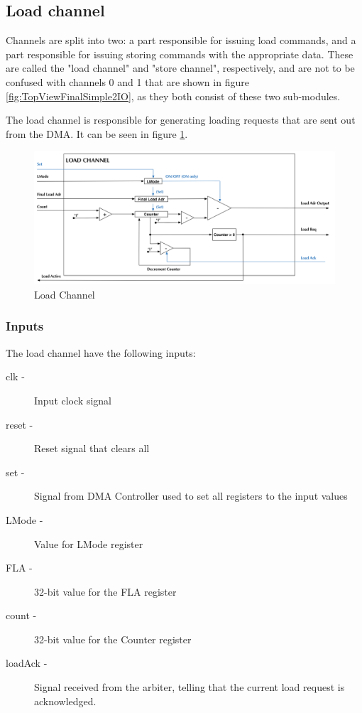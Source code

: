 \begin{appendix}
\subsection{Load channel}
Channels are split into two: 
a part responsible for issuing load commands, and a part responsible for issuing storing commands with the appropriate data.
These are called the "load channel" and "store channel", respectively, and are not to be confused with channels 0 and 1 that are shown in figure \ref{fig:TopViewFinalSimple2IO}, as they both consist of these two sub-modules.
  
The load channel is responsible for generating loading requests that are sent out from the DMA.
It can be seen in figure \ref{fig:loadChannel}.

\begin{figure}[h!]
    \centering
    \includegraphics[width=1.0\textwidth]{Figures/DMA/LoadChannel}
    \caption{Load Channel}
    \label{fig:loadChannel}
\end{figure}

\subsubsection{Inputs}
The load channel have the following inputs:

\begin{description}
    \item[clk -]
    Input clock signal
    \item[reset -]
    Reset signal that clears all 
    \item[set - ]
    Signal from DMA Controller used to set all registers to the input values
    \item[LMode -]
    Value for LMode register
    \item[FLA -]
    32-bit value for the FLA register
    \item[count -]
    32-bit value for the Counter register
    \item[loadAck -]
    Signal received from the arbiter, telling that the current load request is acknowledged.
\end{description}


\end{appendix}
